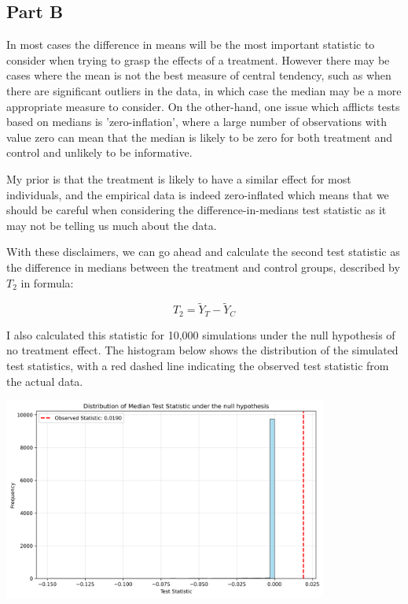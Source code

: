 \documentclass[12pt]{article}
\begin{document}
\subsection{Part B}

In most cases the difference in means will be the most important statistic to consider when trying to grasp the effects of a treatment. However there may be cases where the mean is not the best measure of central tendency, such as when there are significant outliers in the data, in which case the median may be a more appropriate measure to consider. On the other-hand, one issue which afflicts tests based on medians is 'zero-inflation', where a large number of observations with value zero can mean that the median is likely to be zero for both treatment and control and unlikely to be informative. 
\newline


My prior is that the treatment is likely to have a similar effect for most individuals, and the empirical data is indeed zero-inflated which means that we should be careful when considering the difference-in-medians test statistic as it may not be telling us much about the data.
\newline

With these disclaimers, we can go ahead and calculate the second test statistic as the difference in medians between the treatment and control groups, described by $T_2$ in formula:

\[T_2 = \tilde{Y}_T - \tilde{Y}_C\]

I also calculated this statistic for 10,000 simulations under the null hypothesis of no treatment effect. The histogram below shows the distribution of the simulated test statistics, with a red dashed line indicating the observed test statistic from the actual data.

\vspace*{2em}
\includegraphics[width=0.8\textwidth]{stat2_graph.png}
\vspace*{2em}
\end{document}
